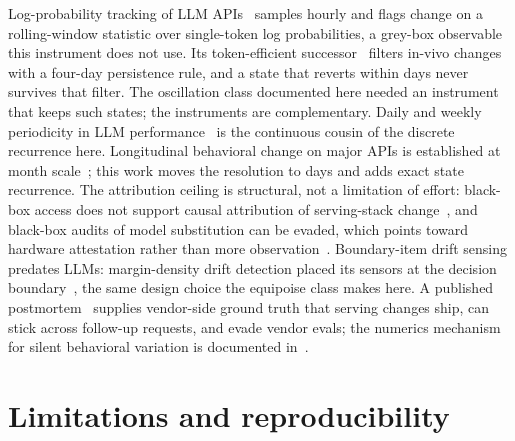 \documentclass[conference]{IEEEtran}
\begin{document}
Log-probability tracking of LLM APIs~\cite{chauvin-a} samples hourly
and flags change on a rolling-window statistic over single-token log
probabilities, a grey-box observable this instrument does not use. Its
token-efficient successor~\cite{chauvin-b} filters in-vivo changes
with a four-day persistence rule, and a state that reverts within days
never survives that filter. The oscillation class documented here
needed an instrument that keeps such states; the instruments are
complementary. Daily and weekly periodicity in LLM
performance~\cite{tschisgale} is the continuous cousin of the discrete
recurrence here. Longitudinal behavioral change on major APIs is
established at month scale~\cite{chen}; this work moves the resolution
to days and adds exact state recurrence. The attribution ceiling is
structural, not a limitation of effort: black-box access does not
support causal attribution of serving-stack change~\cite{casper}, and
black-box audits of model substitution can be evaded, which points
toward hardware attestation rather than more observation~\cite{cai}.
Boundary-item drift sensing predates LLMs: margin-density drift
detection placed its sensors at the decision boundary~\cite{md3}, the
same design choice the equipoise class makes here. A published
postmortem~\cite{vendor-postmortem} supplies vendor-side ground truth
that serving changes ship, can stick across follow-up requests, and
evade vendor evals; the numerics mechanism for silent behavioral
variation is documented in~\cite{nondeterminism}.

\section{Limitations and reproducibility}
\end{document}
